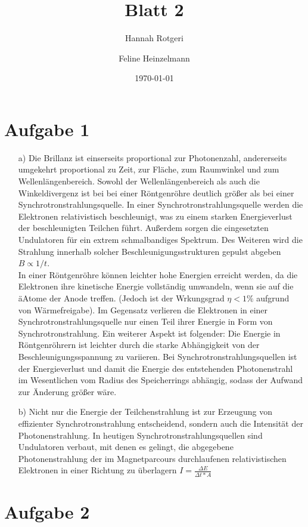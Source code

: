 \documentclass[11pt,a4paper]{article}
\title{Blatt 2}
\date{\today}
\author{Hannah Rotgeri \and Feline Heinzelmann}
\begin{document}
    \maketitle

    \section*{Aufgabe 1}
    	\begin{enumerate}
		\item[a)] Die Brillanz ist einserseits proportional zur Photonenzahl, andererseits umgekehrt proportional zu Zeit, zur Fläche, zum Raumwinkel und zum Wellenlängenbereich. Sowohl der Wellenlängenbereich als auch die Winkeldivergenz ist bei bei einer Röntgenröhre deutlich größer als bei einer Synchrotronstrahlungsquelle. In einer Synchrotronstrahlungsquelle werden die Elektronen relativistisch beschleunigt, was zu einem starken Energieverlust der beschleunigten Teilchen führt. Außerdem sorgen die eingesetzten Undulatoren für ein extrem schmalbandiges Spektrum. Des Weiteren wird die Strahlung innerhalb solcher Beschleunigungsstrukturen gepulst abgeben \( B \propto 1/t \). \\
		
		In einer Röntgenröhre können leichter hohe Energien erreicht werden, da die Elektronen ihre kinetische Energie vollständig umwandeln, wenn sie auf die äAtome der Anode treffen. (Jedoch ist der Wrkungsgrad \( \eta < 1\% \) aufgrund von Wärmefreigabe). Im Gegensatz verlieren die Elektronen in einer Synchrotronstrahlungsquelle nur einen Teil ihrer Energie in Form von Synchrotronstrahlung. Ein weiterer Aspekt ist folgender: Die Energie in Röntgenröhrern ist leichter durch die starke Abhängigkeit von der Beschleunigungsspannung zu variieren. Bei Synchrotronstrahlungsquellen ist der Energieverlust und damit die Energie des entstehenden Photonenstrahl im Wesentlichen vom Radius des Speicherrings abhängig, sodass der Aufwand zur Änderung größer wäre.
		\item[b)] Nicht nur die Energie der Teilchenstrahlung ist zur Erzeugung von effizienter Synchrotronstrahlung entscheidend, sondern auch die Intensität der Photonenstrahlung. In heutigen Synchrotronstrahlungsquellen sind Undulatoren verbaut, mit denen es gelingt, die abgegebene Photonenstrahlung der im Magnetparcours durchlaufenen relativistischen Elektronen in einer Richtung zu überlagern \(I = \frac{\Delta E}{\Delta t * A}\)
	\end{enumerate}
	
    \section*{Aufgabe 2}
	
\end{document}
